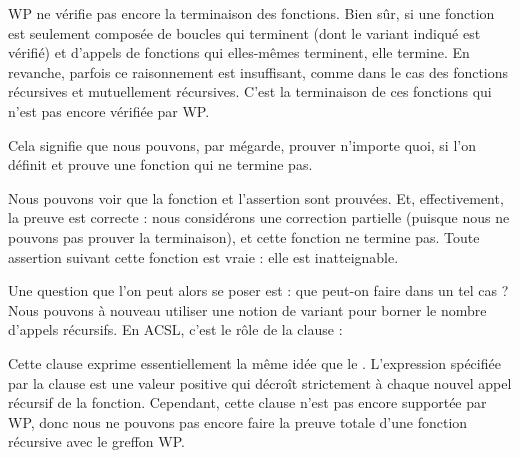 

WP ne vérifie pas encore la terminaison des fonctions. Bien sûr, si
une fonction est seulement composée de boucles qui terminent (dont le variant 
indiqué est vérifié) et d'appels de fonctions qui elles-mêmes terminent, elle
termine. En revanche, parfois ce raisonnement est insuffisant, comme dans le cas
des fonctions récursives et mutuellement récursives. C'est la terminaison de ces
fonctions qui n'est pas encore vérifiée par WP.


Cela signifie que nous pouvons, par mégarde, prouver n'importe quoi, si l'on 
définit et prouve une fonction qui ne termine pas.






Nous pouvons voir que la fonction et l'assertion sont prouvées. Et, effectivement,
la preuve est correcte : nous considérons une correction partielle (puisque nous ne
pouvons pas prouver la terminaison), et cette fonction ne termine pas. Toute
assertion suivant cette fonction est vraie : elle est inatteignable.


Une question que l'on peut alors se poser est : que peut-on faire dans un tel 
cas ? Nous pouvons à nouveau utiliser une notion de variant pour borner le nombre
d'appels récursifs. En ACSL, c'est le rôle de la clause  :




Cette clause exprime essentiellement la même idée que le .
L'expression spécifiée par la clause  est une valeur positive
qui décroît strictement à chaque nouvel appel récursif de la fonction. Cependant,
cette clause n'est pas encore supportée par WP, donc nous ne pouvons pas encore 
faire la preuve totale d'une fonction récursive avec le greffon WP.
